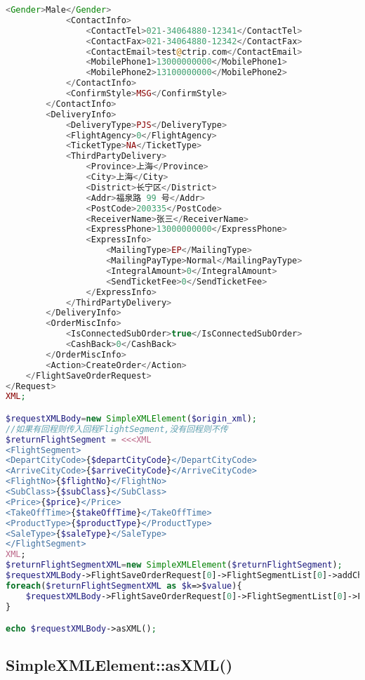 \begin{lstlisting}[language=PHP]
            <Gender>Male</Gender>
            <ContactInfo>
                <ContactTel>021-34064880-12341</ContactTel>
                <ContactFax>021-34064880-12342</ContactFax>
                <ContactEmail>test@ctrip.com</ContactEmail>
                <MobilePhone1>13000000000</MobilePhone1>
                <MobilePhone2>13100000000</MobilePhone2>
            </ContactInfo>
            <ConfirmStyle>MSG</ConfirmStyle>
        </ContactInfo>
        <DeliveryInfo>
            <DeliveryType>PJS</DeliveryType>
            <FlightAgency>0</FlightAgency>
            <TicketType>NA</TicketType>
            <ThirdPartyDelivery>
                <Province>上海</Province>
                <City>上海</City>
                <District>长宁区</District>
                <Addr>福泉路 99 号</Addr>
                <PostCode>200335</PostCode>
                <ReceiverName>张三</ReceiverName>
                <ExpressPhone>13000000000</ExpressPhone>
                <ExpressInfo>
                    <MailingType>EP</MailingType>
                    <MailingPayType>Normal</MailingPayType>
                    <IntegralAmount>0</IntegralAmount>
                    <SendTicketFee>0</SendTicketFee>
                </ExpressInfo>
            </ThirdPartyDelivery>
        </DeliveryInfo>
        <OrderMiscInfo>
            <IsConnectedSubOrder>true</IsConnectedSubOrder>
            <CashBack>0</CashBack>
        </OrderMiscInfo>
        <Action>CreateOrder</Action>
    </FlightSaveOrderRequest>
</Request>
XML;

$requestXMLBody=new SimpleXMLElement($origin_xml);
//如果有回程则传入回程FlightSegment,没有回程则不传
$returnFlightSegment = <<<XML
<FlightSegment>
<DepartCityCode>{$departCityCode}</DepartCityCode>
<ArriveCityCode>{$arriveCityCode}</ArriveCityCode>
<FlightNo>{$flightNo}</FlightNo>
<SubClass>{$subClass}</SubClass>
<Price>{$price}</Price>
<TakeOffTime>{$takeOffTime}</TakeOffTime>
<ProductType>{$productType}</ProductType>
<SaleType>{$saleType}</SaleType>
</FlightSegment>
XML;
$returnFlightSegmentXML=new SimpleXMLElement($returnFlightSegment);
$requestXMLBody->FlightSaveOrderRequest[0]->FlightSegmentList[0]->addChild('FlightSegment');
foreach($returnFlightSegmentXML as $k=>$value){
    $requestXMLBody->FlightSaveOrderRequest[0]->FlightSegmentList[0]->FlightSegment[1]->addChild($k,$value);
}

echo $requestXMLBody->asXML();
\end{lstlisting}


\subsection{SimpleXMLElement::asXML()}


